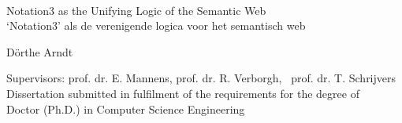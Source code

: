 
{\large \ \vspace{0.25\textheight} \\

\hspace{-\parindent}Notation3 as the Unifying Logic of the Semantic Web\\

\hspace{-\parindent}`Notation3' als de verenigende logica voor het semantisch web


\vspace{0.5cm}
\hspace{-\parindent}D\"orthe Arndt

}


\vspace*{\fill}
\hspace{-\parindent}Supervisors: prof. dr. E. Mannens, prof. dr. R. Verborgh,~ prof. dr. T. Schrijvers\\
\hspace{-\parindent}Dissertation submitted in fulfilment of the requirements for the degree of\\
\hspace{-\parindent}Doctor (Ph.D.) in Computer Science Engineering\\


\vspace{0.5cm}

